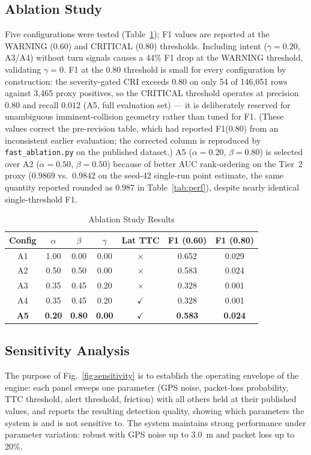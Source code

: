 \documentclass[sn-mathphys-num,Numbered,iicol]{sn-jnl}
\begin{document}
\subsection{Ablation Study}\label{sec:ablation}
Five configurations were tested (Table~\ref{tab:ablation}); F1 values are reported at the WARNING ($0.60$) and CRITICAL ($0.80$) thresholds. Including intent ($\gamma = 0.20$, A3/A4) without turn signals causes a 44\% F1 drop at the WARNING threshold, validating $\gamma = 0$. F1 at the 0.80 threshold is small for every configuration by construction: the severity-gated CRI exceeds $0.80$ on only 54 of 146{,}051 rows against 3{,}465 proxy positives, so the CRITICAL threshold operates at precision $0.80$ and recall $0.012$ (A5, full evaluation set) --- it is deliberately reserved for unambiguous imminent-collision geometry rather than tuned for F1. (These values correct the pre-revision table, which had reported F1(0.80) from an inconsistent earlier evaluation; the corrected column is reproduced by \texttt{fast\_ablation.py} on the published dataset.) A5 ($\alpha = 0.20$, $\beta = 0.80$) is selected over A2 ($\alpha = 0.50$, $\beta = 0.50$) because of better AUC rank-ordering on the Tier~2 proxy ($0.9869$ vs.\ $0.9842$ on the seed-42 single-run point estimate, the same quantity reported rounded as $0.987$ in Table~\ref{tab:perf}), despite nearly identical single-threshold F1.

\begin{table}[htbp]
  \caption{Ablation Study Results}
  \label{tab:ablation}
  \renewcommand{\arraystretch}{1.2}
  \begin{tabular}{@{}ccccccc@{}}
    \toprule
    \textbf{Config} & $\alpha$ & $\beta$ & $\gamma$ & \textbf{Lat TTC}
      & \textbf{F1 (0.60)} & \textbf{F1 (0.80)} \\
    \midrule
    A1 & 1.00 & 0.00 & 0.00 & $\times$ & 0.652 & 0.029 \\
    A2 & 0.50 & 0.50 & 0.00 & $\times$ & 0.583 & 0.024 \\
    A3 & 0.35 & 0.45 & 0.20 & $\times$ & 0.328 & 0.001 \\
    A4 & 0.35 & 0.45 & 0.20 & $\checkmark$ & 0.328 & 0.001 \\
    \textbf{A5} & \textbf{0.20} & \textbf{0.80} & \textbf{0.00}
      & $\checkmark$ & \textbf{0.583} & \textbf{0.024} \\
    \bottomrule
  \end{tabular}
\end{table}

\subsection{Sensitivity Analysis}\label{sec:sensitivity}
The purpose of Fig.~\ref{fig:sensitivity} is to establish the operating envelope of the engine: each panel sweeps one parameter (GPS noise, packet-loss probability, TTC threshold, alert threshold, friction) with all others held at their published values, and reports the resulting detection quality, showing which parameters the system is and is not sensitive to. The system maintains strong performance under parameter variation: robust with GPS noise up to 3.0~m and packet loss up to 20\%.
\end{document}
